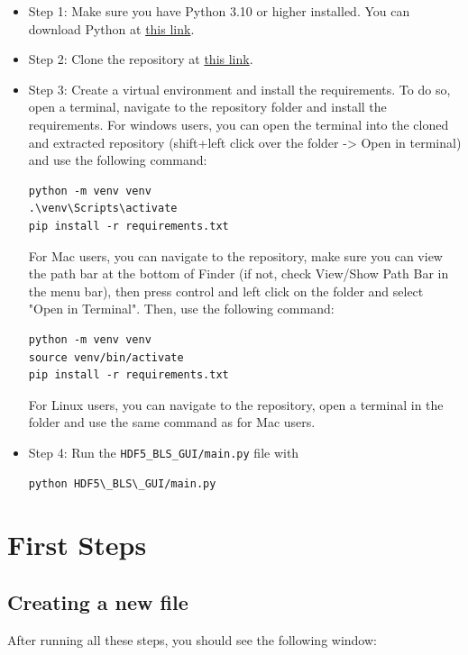 \documentclass{book}
\begin{document}
        \begin{itemize}
            \item Step 1: Make sure you have Python 3.10 or higher installed. You can download Python at \href{https://www.python.org/downloads/}{this link}.
            \item Step 2: Clone the repository at \href{https://github.com/bio-brillouin/HDF5_BLS/tree/main}{this link}.    
            \item Step 3: Create a virtual environment and install the requirements. To do so, open a terminal, navigate to the repository folder and install the requirements. For windows users, you can open the terminal into the cloned and extracted repository (shift+left click over the folder -> Open in terminal) and use the following command:
\begin{lstlisting}
python -m venv venv
.\venv\Scripts\activate
pip install -r requirements.txt
\end{lstlisting}
            For Mac users, you can navigate to the repository, make sure you can view the path bar at the bottom of Finder (if not, check View/Show Path Bar in the menu bar), then press control and left click on the folder and select "Open in Terminal". Then, use the following command:
\begin{lstlisting}
python -m venv venv
source venv/bin/activate
pip install -r requirements.txt
\end{lstlisting}
            For Linux users, you can navigate to the repository, open a terminal in the folder and use the same command as for Mac users.
            \item Step 4: Run the \texttt{HDF5\_BLS\_GUI/main.py} file with
\begin{lstlisting}
python HDF5\_BLS\_GUI/main.py
\end{lstlisting}
        \end{itemize}

    \section{First Steps}
        \subsection{Creating a new file}
            After running all these steps, you should see the following window:
\end{document}
